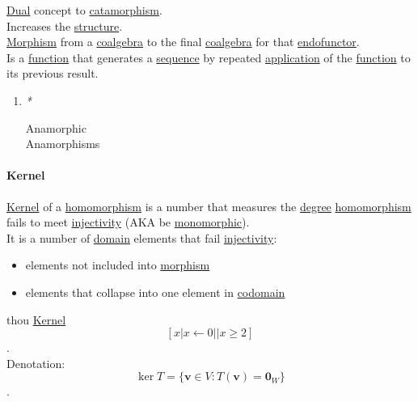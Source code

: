 \documentclass[11pt]{article}
\begin{document}
\hyperref[org0a6da4c]{Dual} concept to \hyperref[org9f46ed9]{catamorphism}.\\

Increases the \hyperref[org93ee82c]{structure}.\\

\hyperref[orgad99fc6]{Morphism} from a \hyperref[orgf6509c0]{coalgebra} to the final \hyperref[orgf6509c0]{coalgebra} for that \hyperref[org4dce7a1]{endofunctor}.\\

Is a \hyperref[orgeb5cddb]{function} that generates a \hyperref[orgf90a45c]{sequence} by repeated \hyperref[orged2f814]{application} of the \hyperref[orgeb5cddb]{function} to its previous result.\\

\begin{enumerate}
\item \emph{*}
\label{sec:org0abda23}

\label{orgc6ce949}Anamorphic\\
\label{orga40fc96}Anamorphisms\\
\end{enumerate}

\paragraph{\label{orge7061fe}Kernel}
\label{sec:org912a936}
\hyperref[orge7061fe]{Kernel} of a \hyperref[org01da5b8]{homomorphism} is a number that measures the \hyperref[org3e1d054]{degree} \hyperref[org01da5b8]{homomorphism} fails to meet \hyperref[orgdf60d9a]{injectivity} (AKA be \hyperref[orga9f7512]{monomorphic}).\\
It is a number of \hyperref[orgf784585]{domain} elements that fail \hyperref[orgdf60d9a]{injectivity}:\\
\begin{itemize}
\item elements not included into \hyperref[orgad99fc6]{morphism}\\
\item elements that collapse into one element in \hyperref[orgee70232]{codomain}\\
\end{itemize}
thou \hyperref[orge7061fe]{Kernel} $$ [ x | x \leftarrow 0 || x \ge 2 ] $$.\\

Denotation:\\
$$ \operatorname{ker}T = \{ \mathbf{v} \in V:T(\mathbf{v}) = \mathbf{0}_{W} \} $$.\\
\end{document}
